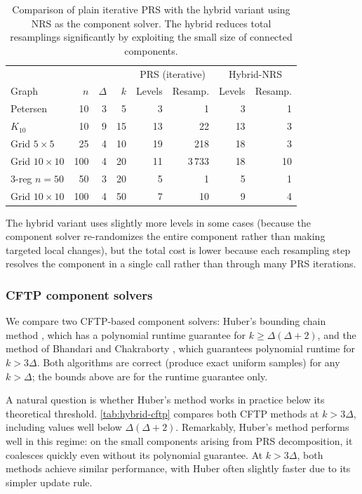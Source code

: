 \documentclass[12pt, a4paper]{article}
\theoremstyle{plain}
\theoremstyle{definition}
\theoremstyle{remark}
\begin{document}
\begin{table}[ht]
\centering
\begin{tabular}{l r r r | r r | r r}
\hline
 & & & & \multicolumn{2}{c|}{PRS (iterative)} & \multicolumn{2}{c}{Hybrid-NRS} \\
Graph & \(n\) & \(\Delta\) & \(k\) & Levels & Resamp. & Levels & Resamp. \\
\hline
Petersen & 10 & 3 & 5 & 3 & 1 & 3 & 1 \\
\(K_{10}\) & 10 & 9 & 15 & 13 & 22 & 13 & 3 \\
Grid \(5\times5\) & 25 & 4 & 10 & 19 & 218 & 18 & 3 \\
Grid \(10\times10\) & 100 & 4 & 20 & 11 & 3\,733 & 18 & 10 \\
3-reg \(n=50\) & 50 & 3 & 20 & 5 & 1 & 5 & 1 \\
Grid \(10\times10\) & 100 & 4 & 50 & 7 & 10 & 9 & 4 \\
\hline
\end{tabular}
\caption{Comparison of plain iterative PRS with the hybrid variant using NRS as the component solver. The hybrid reduces total resamplings significantly by exploiting the small size of connected components.}
\label{tab:hybrid}
\end{table}

The hybrid variant uses slightly more levels in some cases (because the component solver re-randomizes the entire component rather than making targeted local changes), but the total cost is lower because each resampling step resolves the component in a single call rather than through many PRS iterations.

\subsubsection*{CFTP component solvers}

We compare two CFTP-based component solvers: Huber's bounding chain method \cite{MH96}, which has a polynomial runtime guarantee for \(k\geq\Delta(\Delta+2)\), and the method of Bhandari and Chakraborty \cite{BC20}, which guarantees polynomial runtime for \(k>3\Delta\). Both algorithms are correct (produce exact uniform samples) for any \(k>\Delta\); the bounds above are for the runtime guarantee only.

A natural question is whether Huber's method works in practice below its theoretical threshold. \autoref{tab:hybrid-cftp} compares both CFTP methods at \(k>3\Delta\), including values well below \(\Delta(\Delta+2)\). Remarkably, Huber's method performs well in this regime: on the small components arising from PRS decomposition, it coalesces quickly even without its polynomial guarantee. At \(k>3\Delta\), both methods achieve similar performance, with Huber often slightly faster due to its simpler update rule.
\end{document}
